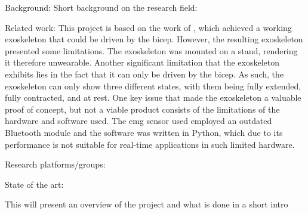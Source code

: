 Background: 
    Short background on the research field:

    Related work: %
        This project is based on the work of \cite{AFES}, which achieved a working exoskeleton that could be driven by the bicep. However, the resulting 
        exoskeleton presented some limitations. The exoskeleton was mounted on a stand, rendering it therefore unwearable. Another significant limitation 
        that the exoskeleton exhibits lies in the fact that it can only be driven by the bicep. As such, the exoskeleton can only show three different states, 
        with them being fully extended, fully contracted, and at rest. One key issue that made the exoskeleton a valuable proof of concept, but not a viable 
        product consists of the limitations of the hardware and software used. The \acs{emg} sensor used employed an outdated Bluetooth module and the software was 
        written in Python, which due to its performance is not suitable for real-time applications in such limited hardware.

    Research platforms/groups:

    State of the art:


    This will present an overview of the project and what is done in a short intro
